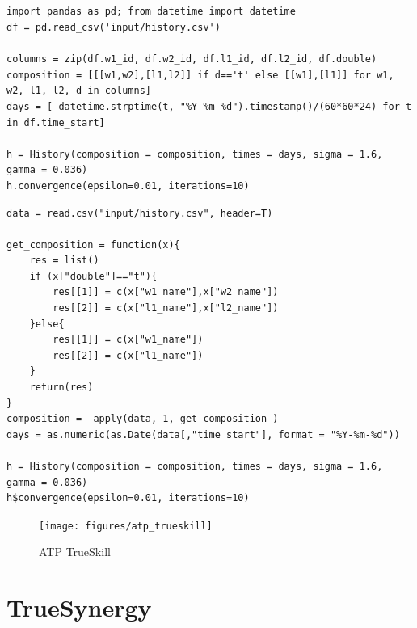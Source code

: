 \documentclass[a4paper,11pt]{book}
\theoremstyle{definition}
\newif\ifen
\newif\ifes
\newcommand{\en}[1]{\ifen#1\fi}
\newcommand{\es}[1]{\ifes#1\fi}
\begin{document}
\subsection{\en{The history of the Association of Tennis Professionals (ATP)}} \label{sec:appendix_atp_code}
%
\begin{lstlisting}[backgroundcolor=\color{python!60},caption={\en{\texttt{Python} code}\es{C\'odigo \texttt{Python}}},aboveskip=0.0 \baselineskip, belowskip=0.1cm]
import pandas as pd; from datetime import datetime
df = pd.read_csv('input/history.csv')

columns = zip(df.w1_id, df.w2_id, df.l1_id, df.l2_id, df.double)
composition = [[[w1,w2],[l1,l2]] if d=='t' else [[w1],[l1]] for w1, w2, l1, l2, d in columns]
days = [ datetime.strptime(t, "%Y-%m-%d").timestamp()/(60*60*24) for t in df.time_start]

h = History(composition = composition, times = days, sigma = 1.6, gamma = 0.036)
h.convergence(epsilon=0.01, iterations=10)
\end{lstlisting}
%
\begin{lstlisting}[backgroundcolor=\color{r!50},caption={\en{\texttt{R} code}\es{C\'odigo \texttt{R}}},aboveskip=0.0 \baselineskip, belowskip=0.1cm]
data = read.csv("input/history.csv", header=T)

get_composition = function(x){
    res = list()
    if (x["double"]=="t"){
        res[[1]] = c(x["w1_name"],x["w2_name"])
        res[[2]] = c(x["l1_name"],x["l2_name"])
    }else{
        res[[1]] = c(x["w1_name"])
        res[[2]] = c(x["l1_name"])
    }
    return(res)
}
composition =  apply(data, 1, get_composition )
days = as.numeric(as.Date(data[,"time_start"], format = "%Y-%m-%d"))

h = History(composition = composition, times = days, sigma = 1.6, gamma = 0.036)
h$convergence(epsilon=0.01, iterations=10)
\end{lstlisting}

\begin{figure}[ht!]
 \centering
  \texttt{[image: figures/atp\_trueskill]}
  \caption{ATP TrueSkill}
  \label{atp_trueskill}
\end{figure}




\section{TrueSynergy} \label{sec:TrueSynergy}
\end{document}
